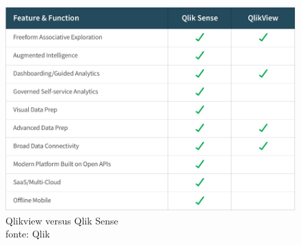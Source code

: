 \begin{figure}[h]
	\centering
	\includegraphics[scale=0.40]{./figures/cap1/qlikview.png}
	\caption{Qlikview versus Qlik Sense \\ fonte: Qlik}
\end{figure}





